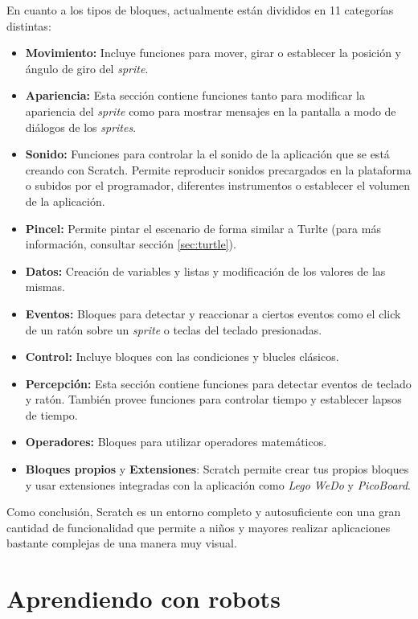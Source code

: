 En cuanto a los tipos de bloques, actualmente están divididos en 11 categorías distintas:
\begin{itemize}
	\item \textbf{Movimiento:} Incluye funciones para mover, girar o establecer la posición y ángulo de giro del \emph{sprite}.
	\item \textbf{Apariencia:} Esta sección contiene funciones tanto para modificar la apariencia del \emph{sprite} como para mostrar mensajes en la pantalla a modo de diálogos de los \emph{sprites}.
	\item \textbf{Sonido:} Funciones para controlar la el sonido de la aplicación que se está creando con Scratch. Permite reproducir sonidos precargados en la plataforma o subidos por el programador, diferentes instrumentos o establecer el volumen de la aplicación.
	\item \textbf{Pincel:} Permite pintar el escenario de forma similar a Turlte (para más información, consultar sección \ref{sec:turtle}).
	\item \textbf{Datos:} Creación de variables y listas y modificación de los valores de las mismas.
	\item \textbf{Eventos:} Bloques para detectar y reaccionar a ciertos eventos como el click de un ratón sobre un \emph{sprite} o teclas del teclado presionadas.
	\item \textbf{Control:} Incluye bloques con las condiciones y blucles clásicos.
	\item \textbf{Percepción:} Esta sección contiene funciones para detectar eventos de teclado y ratón. También provee funciones para controlar tiempo y establecer lapsos de tiempo. 
	\item \textbf{Operadores:} Bloques para utilizar operadores matemáticos.
	\item \textbf{Bloques propios} y \textbf{Extensiones}: Scratch permite crear tus propios bloques y usar extensiones integradas con la aplicación como \emph{Lego WeDo} y \emph{PicoBoard}. 
\end{itemize}


Como conclusión, Scratch es un entorno completo y autosuficiente con una gran cantidad de funcionalidad que permite a niños y mayores realizar aplicaciones bastante complejas de una manera muy visual. 



\section{Aprendiendo con robots}
\label{sec:aprendiendo-robots}

